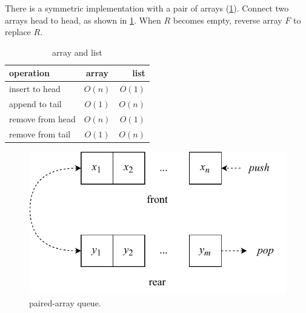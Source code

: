 \documentclass[b5paper]{article}
\begin{document}

There is a symmetric implementation with a pair of arrays (\cref{tab:array-list-comp}). Connect two arrays head to head, as shown in \cref{fig:horseshoe-array}. When $R$ becomes empty, reverse array $F$ to replace $R$.

\begin{table}[htbp]
\centering
\begin{tabular}{l | c | r}
  \hline
  operation & array & list \\
  \hline
  insert to head & $O(n)$ & $O(1)$ \\
  append to tail & $O(1)$ & $O(n)$ \\
  remove from head & $O(n)$ & $O(1)$ \\
  remove from tail & $O(1)$ & $O(n)$ \\
  \hline
\end{tabular}
\caption{array and list}
\label{tab:array-list-comp}
\end{table}

\begin{figure}[htbp]
  \centering
  \includegraphics[scale=0.6]{img/paired-arrayq}
  \caption{paired-array queue.}
  \label{fig:horseshoe-array}
\end{figure}

\begin{Exercise}\label{ex:paired-list-queue}
\end{Exercise}
\end{document}
